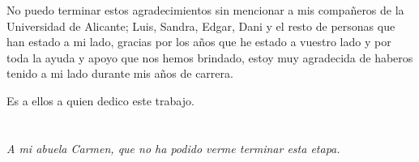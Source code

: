 No puedo terminar estos agradecimientos sin mencionar a mis compañeros de la Universidad de Alicante; Luis, Sandra, Edgar, Dani y el resto de personas que han estado a mi lado, gracias por los años que he estado a vuestro lado y por toda la ayuda y apoyo que nos hemos brindado, estoy muy agradecida de haberos tenido a mi lado durante mis años de carrera.

Es a ellos a quien dedico este trabajo.


\cleardoublepage %
\chapter*{}
\setlength{\leftmargin}{0.5\textwidth}
\setlength{\parsep}{0cm}
\addtolength{\topsep}{0.5cm}
\begin{flushright}
\small\em{
A mi abuela Carmen, que no ha podido verme terminar esta etapa.\\
}
\end{flushright}

\cleardoublepage %
